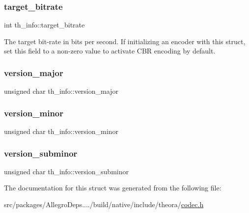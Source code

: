 \subsubsection{\texorpdfstring{target\+\_\+bitrate}{target\_bitrate}}
{\footnotesize\ttfamily int th\+\_\+info\+::target\+\_\+bitrate}

The target bit-\/rate in bits per second. If initializing an encoder with this struct, set this field to a non-\/zero value to activate C\+BR encoding by default. \mbox{\label{structth__info_a60b3e2cac006fee0e105a918d6a5a9f9}} 
\subsubsection{\texorpdfstring{version\+\_\+major}{version\_major}}
{\footnotesize\ttfamily unsigned char th\+\_\+info\+::version\+\_\+major}

\mbox{\label{structth__info_abb1d4887a8079c6c5aaa6d7229f243d7}} 
\subsubsection{\texorpdfstring{version\+\_\+minor}{version\_minor}}
{\footnotesize\ttfamily unsigned char th\+\_\+info\+::version\+\_\+minor}

\mbox{\label{structth__info_abfacc79b7cabae12b6ac2484f76602d3}} 
\subsubsection{\texorpdfstring{version\+\_\+subminor}{version\_subminor}}
{\footnotesize\ttfamily unsigned char th\+\_\+info\+::version\+\_\+subminor}



The documentation for this struct was generated from the following file\+:\begin{DoxyCompactItemize}
\item 
src/packages/\+Allegro\+Deps..../build/native/include/theora/\hyperlink{theora_2codec_8h}{codec.\+h}\end{DoxyCompactItemize}
